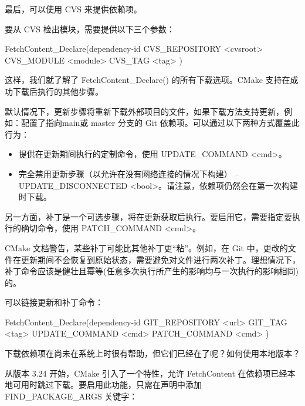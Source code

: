 最后，可以使用 CVS 来提供依赖项。


要从 CVS 检出模块，需要提供以下三个参数：

\begin{shell}
FetchContent_Declare(dependency-id
                     CVS_REPOSITORY <cvsroot>
                     CVS_MODULE <module>
                     CVS_TAG <tag>
)
\end{shell}

这样，我们就了解了 FetchContent\_Declare() 的所有下载选项。CMake 支持在成功下载后执行的其他步骤。


默认情况下，更新步骤将重新下载外部项目的文件，如果下载方法支持更新，例如：配置了指向main或 master 分支的 Git 依赖项。可以通过以下两种方式覆盖此行为：

\begin{itemize}
\item
提供在更新期间执行的定制命令，使用 UPDATE\_COMMAND <cmd>。

\item
完全禁用更新步骤（以允许在没有网络连接的情况下构建） – UPDATE\_DISCONNECTED <bool>。请注意，依赖项仍然会在第一次构建时下载。
\end{itemize}

另一方面，补丁是一个可选步骤，将在更新获取后执行。要启用它，需要指定要执行的确切命令，使用 PATCH\_COMMAND <cmd>。

CMake 文档警告，某些补丁可能比其他补丁更“粘”。例如，在 Git 中，更改的文件在更新期间不会恢复到原始状态，需要避免对文件进行两次补丁。理想情况下，补丁命令应该是健壮且幂等(任意多次执行所产生的影响均与一次执行的影响相同)的。

可以链接更新和补丁命令：

\begin{shell}
FetchContent_Declare(dependency-id
                     GIT_REPOSITORY <url>
                     GIT_TAG <tag>
                     UPDATE_COMMAND <cmd>
                     PATCH_COMMAND <cmd>
)
\end{shell}

下载依赖项在尚未在系统上时很有帮助，但它们已经在了呢？如何使用本地版本？


从版本 3.24 开始，CMake 引入了一个特性，允许 FetchContent 在依赖项已经本地可用时跳过下载。要启用此功能，只需在声明中添加 FIND\_PACKAGE\_ARGS 关键字：

